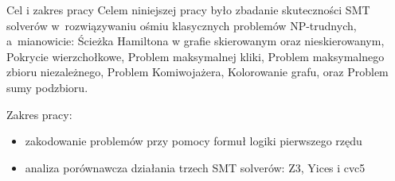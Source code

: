 \begin{frame}{Cel i zakres pracy}
    Celem niniejszej pracy było zbadanie skuteczności SMT solverów w~rozwiązywaniu ośmiu klasycznych problemów NP-trudnych, a~mianowicie: Ścieżka Hamiltona w grafie skierowanym oraz nieskierowanym, Pokrycie wierzchołkowe, Problem maksymalnej kliki, Problem maksymalnego zbioru niezależnego, Problem Komiwojażera, Kolorowanie grafu, oraz Problem sumy podzbioru.
    
    \vspace{10pt}

    Zakres pracy:
    \begin{itemize}
        \item zakodowanie problemów przy pomocy formuł logiki pierwszego rzędu
        \item analiza porównawcza działania trzech SMT solverów: Z3, Yices i cvc5
    \end{itemize}
\end{frame}